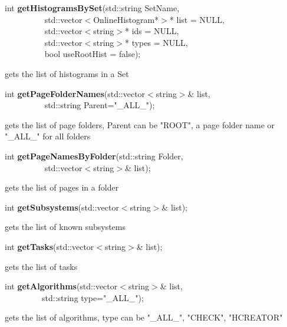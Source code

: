 \item    int {\bf getHistogramsBySet}(std::string SetName,\\\mbox{}~~~~~~~~~
			 std::vector$<$OnlineHistogram*$>$* list = NULL,\\\mbox{}~~~~~~~~~
			 std::vector$<$string$>$* ids = NULL,\\\mbox{}~~~~~~~~~
			 std::vector$<$string$>$* types = NULL,\\\mbox{}~~~~~~~~~
			 bool useRootHist = false);

 gets the list of histograms in a Set


\item    int {\bf getPageFolderNames}(std::vector$<$string$>$\& list,\\\mbox{}~~~~~~~~~ std::string Parent="\_ALL\_");


 gets the list of page folders, Parent can be "ROOT", a page folder name or "\_ALL\_" for all folders  


\item    int {\bf getPageNamesByFolder}(std::string Folder,\\\mbox{}~~~~~~~~~
			   std::vector$<$string$>$\& list);

 gets the list of pages in a folder


\item    int {\bf getSubsystems}(std::vector$<$string$>$\& list);


 gets the list of known subsystems


\item    int {\bf getTasks}(std::vector$<$string$>$\& list);


 gets the list of tasks


\item    int {\bf getAlgorithms}(std::vector$<$string$>$\& list,\\\mbox{}~~~~~~~~~std::string type="\_ALL\_");


 gets the list of algorithms, type can be "\_ALL\_", "CHECK", "HCREATOR"


